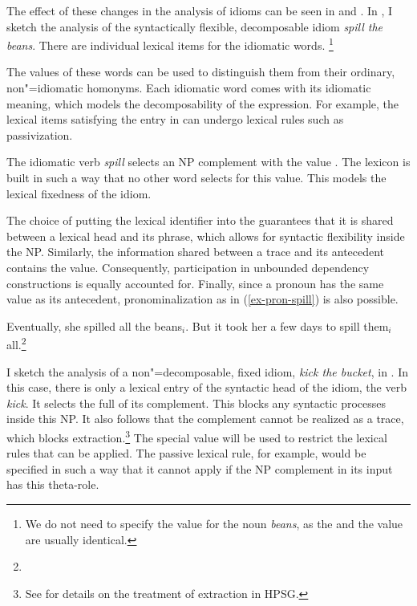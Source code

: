 \documentclass[output=paper
 	        ,biblatex
                ,babelshorthands
                ,newtxmath
                ,draftmode
                ,colorlinks, citecolor=brown
]{langscibook}
\begin{document}
The effect of these changes in the analysis of idioms can be seen in  and . In , I sketch the analysis of the syntactically flexible, decomposable idiom \emph{spill the beans}.  There are individual lexical items for the idiomatic words.%
\footnote{We do not need to specify the  value for the noun \emph{beans}, as the  and the  value are usually identical.}

\eal %
\label{ke-spill}
\ex 
\label{le-idiomatic-spill}
\ex 
{}
\zl 

\noindent
The  values of these words can be used to distinguish them from their ordinary,
non"=idiomatic homonyms.  Each idiomatic word comes with its idiomatic meaning, which models the
decomposability of the expression.  For example, the lexical items satisfying the entry in
 can undergo lexical rules such as passivization.

The idiomatic verb \emph{spill} selects an NP complement with the  value
.  The lexicon is built in such a way that no other word selects for this
 value.  This models the lexical fixedness of the idiom.

The choice of putting the lexical identifier into the  guarantees that it is shared
between a lexical head and its phrase, which allows for syntactic flexibility inside the NP.
Similarly, the information shared between a trace and its antecedent contains the 
value. Consequently, participation in unbounded dependency constructions is equally accounted for.
Finally, since a pronoun has the same  value as its antecedent, pronominalization as in
(\ref{ex-pron-spill}) is also possible.

\ea
 \label{ex-pron-spill}
Eventually, she spilled all the beans$_i$. But it took her a few days to spill them$_i$
all.\footnote{
}
\z

I sketch the analysis of a non"=decomposable, fixed idiom, \emph{kick the bucket}, in
.  In this case, there is only a lexical entry of the syntactic head of the idiom,
the verb \emph{kick}.  It selects the full  of its complement. This blocks any syntactic
processes inside this NP. It also follows that the complement cannot be realized as a trace, which
blocks extraction.\footnote{See  for
  details on the treatment of extraction in HPSG.}  
%
The special  value  will be used to restrict the lexical rules that can
be applied.  The passive lexical rule, for example, would be specified in such a way that it cannot
apply if the NP complement in its input has this theta-role.
\end{document}
